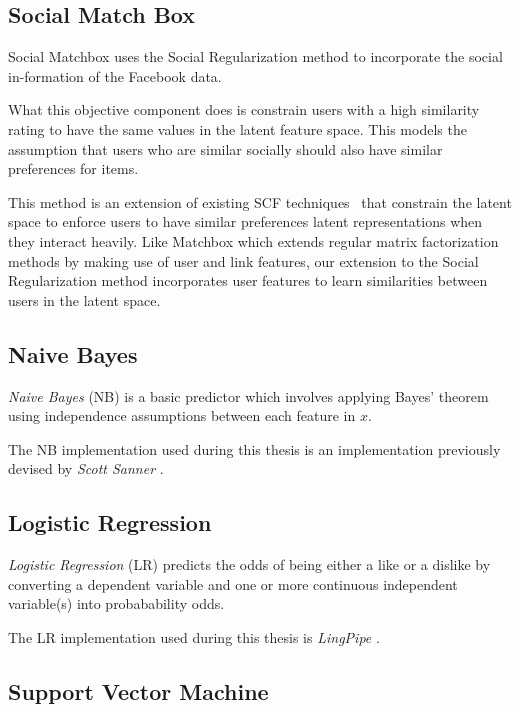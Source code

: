 \subsection{Social Match Box}
\label{sec:sr}

Social Matchbox uses the Social Regularization method to incorporate the social in-formation of the Facebook data. ~\cite{joseph}

What this objective component does is constrain users with a high similarity rating to have the same values in the latent feature space. 
This models the assumption that users who are similar socially should also have similar preferences for items.

This method is an extension of existing SCF techniques~\cite{lla,socinf} that constrain the latent space to enforce users 
to have similar preferences latent representations when they interact heavily. Like Matchbox which extends regular matrix factorization
methods by making use of user and link features, our extension to the Social Regularization method incorporates user features to learn
similarities between users in the latent space.


\subsection{Naive Bayes}
\label{sec:nb}

\emph{Naive Bayes} (NB) is a basic predictor which involves applying Bayes' theorem using independence assumptions between each feature in $x$.

The NB implementation used during this thesis is an implementation previously devised by \emph{Scott Sanner} \cite{scott}.

\subsection{Logistic Regression}
\label{sec:lr}

\emph{Logistic Regression} (LR) predicts the odds of being either a like or a dislike by converting a dependent variable and one or more continuous 
independent variable(s) into probabability odds.

The LR implementation used during this thesis is \emph{LingPipe} \cite{lin}.

\subsection{Support Vector Machine}
\label{sec:svm}

